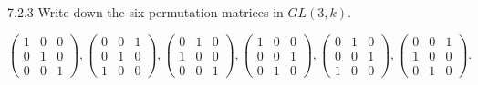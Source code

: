 \documentclass[twoside]{article}
\begin{document}
\begin{ejercicio}{7.2.3}
Write down the six permutation matrices in $GL(3, k)$.
\end{ejercicio}
\begin{solucion}
\[
\begin{pmatrix}
1 & 0 & 0\\
0 & 1 & 0\\
0 & 0 & 1
\end{pmatrix}, \begin{pmatrix}
0 & 0 & 1\\
0 & 1 & 0\\
1 & 0 & 0
\end{pmatrix},\begin{pmatrix}
0 & 1 & 0\\
1 & 0 & 0\\
0 & 0 & 1
\end{pmatrix}, \begin{pmatrix}
1 & 0 & 0\\
0 & 0 & 1\\
0 & 1 & 0
\end{pmatrix}, \begin{pmatrix}
0 & 1 & 0\\
0 & 0 & 1\\
1 & 0 & 0
\end{pmatrix},
\begin{pmatrix}
0 & 0 & 1\\
1 & 0 & 0\\
0 & 1 & 0
\end{pmatrix}.
\]

\end{solucion}


\newpage
\end{document}
